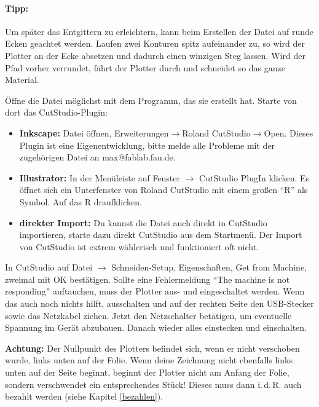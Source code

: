 \documentclass{\basedir/fablab-document}
\newcommand{\pfeil}{\ensuremath{\rightarrow}}
\begin{document}
\paragraph{Tipp:} Um später das Entgittern zu erleichtern, kann beim Erstellen der Datei auf runde Ecken geachtet werden.
Laufen zwei Konturen spitz aufeinander zu, so wird der Plotter an der Ecke absetzen und dadurch einen winzigen Steg lassen.
Wird der Pfad vorher verrundet, fährt der Plotter durch und schneidet so das ganze Material.

Öffne die Datei möglichst mit dem Programm, das sie erstellt hat. Starte von dort das CutStudio-Plugin:

\begin{itemize}
 \item \textbf{Inkscape:} Datei öffnen, Erweiterungen\pfeil Roland CutStudio\pfeil Open. Dieses Plugin ist eine Eigenentwicklung, bitte melde alle Probleme mit der zugehörigen Datei an max@fablab.fau.de.

\item \textbf{Illustrator:} In der Menüleiste auf Fenster $\rightarrow$ CutStudio PlugIn klicken. Es öffnet sich ein Unterfenster von Roland CutStudio mit einem großen \enquote{R} als Symbol. Auf das R draufklicken.

\item \textbf{direkter Import:} Du kannst die Datei auch direkt in CutStudio importieren, starte dazu direkt CutStudio aus dem Startmenü. Der Import von CutStudio ist extrem wählerisch und funktioniert oft nicht.
\end{itemize}



In CutStudio auf Datei $\rightarrow$ Schneiden-Setup, Eigenschaften, Get from Machine, zweimal mit OK bestätigen.
Sollte eine Fehlermeldung \enquote{The machine is not responding} auftauchen, muss der Plotter aus- und eingeschaltet werden.
Wenn das auch noch nichts hilft, ausschalten und auf der rechten Seite den USB-Stecker sowie das Netzkabel ziehen.
Jetzt den Netzschalter betätigen, um eventuelle Spannung im Gerät abzubauen.
Danach wieder alles einstecken und einschalten.

\textbf{Achtung:} Der Nullpunkt des Plotters befindet sich, wenn er nicht verschoben wurde, links unten auf der Folie.
Wenn deine Zeichnung nicht ebenfalls links unten auf der Seite beginnt, beginnt der Plotter nicht am Anfang der Folie, sondern verschwendet ein entsprechendes Stück!
Dieses muss dann i.\,d.\,R. auch bezahlt werden (siehe Kapitel \ref{bezahlen}).
\end{document}
